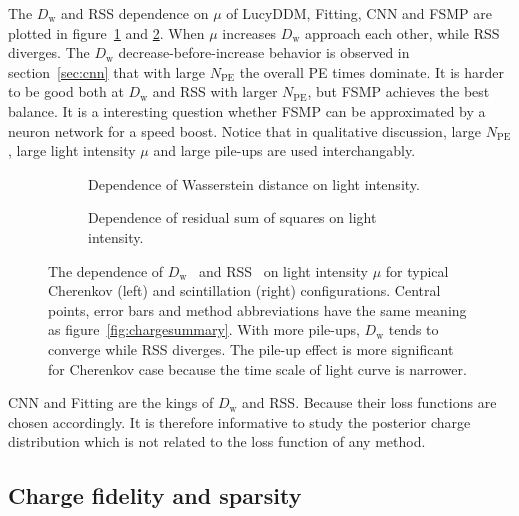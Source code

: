
The $D_\mathrm{w}$ and RSS dependence on $\mu$ of LucyDDM, Fitting, CNN and FSMP are plotted in figure~\ref{fig:wdistsummary} and \ref{fig:rsssummary}.  When $\mu$ increases $D_\mathrm{w}$ approach each other, while RSS diverges.  The $D_\mathrm{w}$ decrease-before-increase behavior is observed in section~\ref{sec:cnn} that with large $N_\mathrm{PE}$ the overall PE times dominate.  It is harder to be good both at $D_\mathrm{w}$ and RSS with larger $N_\mathrm{PE}$, but FSMP achieves the best balance.  It is a interesting question whether FSMP can be approximated by a neuron network for a speed boost.  Notice that in qualitative discussion, large $N_\mathrm{PE}$, large light intensity $\mu$ and large pile-ups are used interchangably.
\begin{figure}[H]
  \begin{subfigure}[b]{\textwidth}
    \resizebox{\textwidth}{!}{}
    \caption{\label{fig:wdistsummary}Dependence of Wasserstein distance on light intensity.}
  \end{subfigure}

  \vspace{0.5em}
  \begin{subfigure}[b]{\textwidth}
    \resizebox{\textwidth}{!}{}
    \caption{\label{fig:rsssummary}Dependence of residual sum of squares on light intensity.}
  \end{subfigure}
  \caption{\label{fig:summary}The dependence of $D_\mathrm{w}$~ and RSS~ on light intensity $\mu$ for typical Cherenkov (left) and scintillation (right) configurations.  Central points, error bars and method abbreviations have the same meaning as figure~\ref{fig:chargesummary}.  With more pile-ups, $D_\mathrm{w}$ tends to converge while RSS diverges.  The pile-up effect is more significant for Cherenkov case because the time scale of light curve is narrower. }
\end{figure}

CNN and Fitting are the kings of $D_\mathrm{w}$ and RSS.  Because their loss functions are chosen accordingly.  It is therefore informative to study the posterior charge distribution which is not related to the loss function of any method.

\subsection{Charge fidelity and sparsity}

